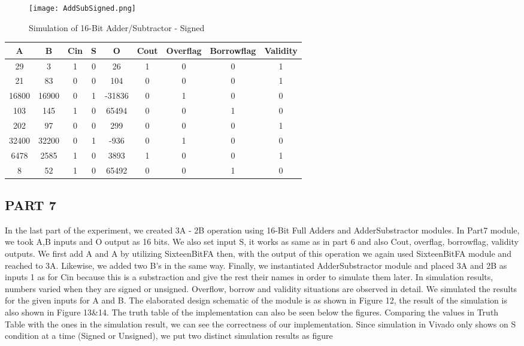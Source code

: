 \documentclass[pdftex,12pt,a4paper]{article}
\begin{document}
\begin{figure}[ht]
	\centering
	\texttt{[image: AddSubSigned.png]}
	\caption{Simulation of 16-Bit Adder/Subtractor - Signed}
	\label{fig1}
\end{figure}

\begin{center}
 \begin{tabular}{|c|c|c|c|c|c|c|c|c|} 
 \hline
 A & B & Cin & S & O & Cout & Overflag & Borrowflag & Validity \\ 
 \hline\hline
 29 & 3 & 1 & 0 & 26 & 1 & 0 & 0 & 1\\ 
 \hline
 21 & 83 & 0 & 0 & 104 & 0 & 0 & 0 & 1\\
 \hline
 16800 & 16900 & 0 & 1 & -31836 & 0 & 1 & 0 & 0\\
 \hline
 103 & 145 & 1 & 0 & 65494 & 0 & 0 & 1 & 0\\
 \hline
 202 & 97 & 0 & 0 & 299 & 0 & 0 & 0 & 1\\
 \hline
 32400 & 32200 & 0 & 1 & -936 & 0 & 1 & 0 & 0\\
 \hline
 6478 & 2585 & 1 & 0 & 3893 & 1 & 0 & 0 & 1\\
 \hline
 8 & 52 & 1 & 0 & 65492 & 0 & 0 & 1 & 0\\
  \hline
\end{tabular}
\end{center}

\newpage
\subsection{PART 7}
In the last part of the experiment, we created 3A - 2B operation using 16-Bit Full Adders and AdderSubstractor modules. In Part7 module, we took A,B inputs and O output as 16 bits. We also set input S, it works as same as in part 6 and also Cout, overflag, borrowflag, validity outputs. We first add A and A by utilizing SixteenBitFA then, with the output of this operation we again used SixteenBitFA module and reached to 3A. Likewise, we added two B's in the same way. Finally, we instantiated AdderSubstractor module and placed 3A and 2B as inputs 1 as for Cin because this is a substraction and give the rest their names in order to simulate them later. 
In simulation results, numbers varied when they are signed or unsigned. Overflow, borrow and validity situations are observed in detail. We simulated the results for the given inputs for A and B. The elaborated design schematic of the module is as shown in Figure 12, the result of the simulation is also shown in Figure 13&14. The truth table of the implementation can also be seen below the figures. Comparing the values in Truth Table with the ones in the simulation result, we can see the correctness of our implementation. Since simulation in Vivado only shows on S condition at a time (Signed or Unsigned), we put two distinct simulation results as figure
\end{document}
